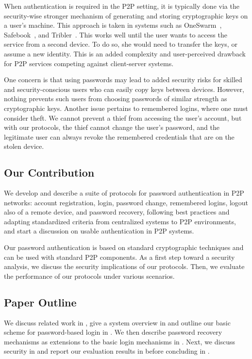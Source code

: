 When authentication is required in the P2P setting, it is typically done
via the security-wise stronger mechanism of generating and storing
cryptographic keys on a user's machine. This approach is taken in systems such
as OneSwarm~\cite{IsdalPKA10}, Safebook~\cite{CutilloMS09}, and
Tribler~\cite{AbbasPES09}.  This works well until the user wants to access the service from a second
device. To do so, she would need to transfer the keys, or assume a new
identity. This is an added complexity and user-perceived drawback for P2P
services competing against client-server systems.

One concern is that using passwords may lead to added security risks
for skilled and security-conscious users who can easily copy keys
between devices.  However, nothing prevents such users from choosing
passwords of similar strength as cryptographic keys. Another issue
pertains to remembered logins, where one must consider theft. We
cannot prevent a thief from accessing the user's account, but with our
protocols, the thief cannot change the user's password, and the
legitimate user can always revoke the remembered credentials that are
on the stolen device.

\subsection{Our Contribution}
We develop and describe a suite of protocols for password
authentication in P2P networks: account registration, login,
password change, remembered logins, logout also of a remote device, and password
recovery, following best practices and adapting standardized criteria
from centralized systems to P2P environments, and start a
discussion on usable authentication in P2P systems.

Our password authentication is based on standard
cryptographic techniques and can be used with standard P2P components. As a
first step toward a security analysis, we discuss the security implications of
our protocols. Then, we evaluate the performance of our protocols under various
scenarios.

\subsection{Paper Outline}
We discuss related work in , give a system
overview in  and outline our basic scheme for
password-based login in . We then describe
password recovery mechanisms as extensions to the basic login
mechanisms in . Next, we discuss security in
 and report our evaluation results in
 before concluding in .

